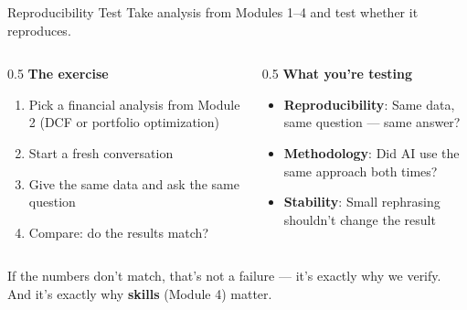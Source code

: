 \documentclass[aspectratio=169]{beamer}
\begin{document}
\begin{frame}{Reproducibility Test}
Take analysis from Modules 1--4 and test whether it reproduces.
\vspace{0.3cm}
\begin{columns}[T]
\begin{column}{0.5\textwidth}
\textbf{The exercise}
\begin{enumerate}\small
  \item Pick a financial analysis from Module 2 (DCF or portfolio optimization)
  \item Start a \alert{fresh conversation}
  \item Give the same data and ask the same question
  \item Compare: do the results match?
\end{enumerate}
\end{column}
\begin{column}{0.5\textwidth}
\textbf{What you're testing}
\begin{itemize}\small
  \item \textbf{Reproducibility}: Same data, same question --- same answer?
  \item \textbf{Methodology}: Did AI use the same approach both times?
  \item \textbf{Stability}: Small rephrasing shouldn't change the result
\end{itemize}
\end{column}
\end{columns}
\vspace{0.3cm}
If the numbers don't match, that's not a failure --- it's \alert{exactly why we verify}. And it's exactly why \textbf{skills} (Module 4) matter.
\end{frame}
\end{document}
